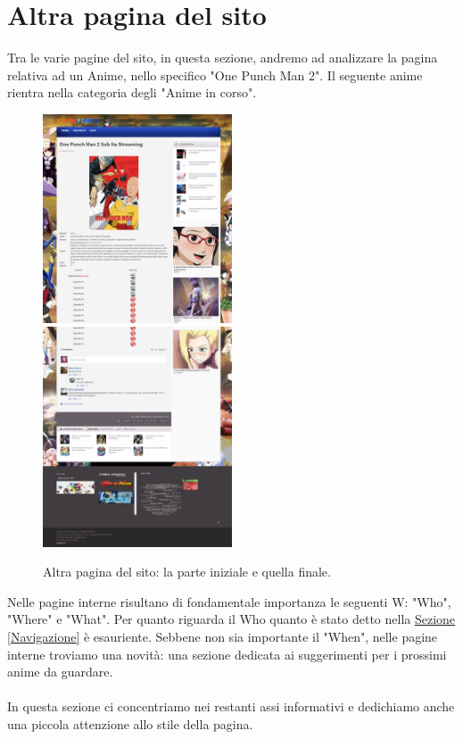 \section{Altra pagina del sito}
Tra le varie pagine del sito, in questa sezione, andremo ad analizzare la pagina relativa ad un Anime, nello specifico "One Punch Man 2". Il seguente anime rientra nella categoria degli "Anime in corso".

\begin{figure}[H]
	\includegraphics[width=0.5\textwidth]{img/Pag2_01.png}
	\includegraphics[width=0.5\textwidth]{img/Pag2_02.png}
	\caption{Altra pagina del sito: la parte iniziale e quella finale.} 
	\label{img7} 
\end{figure}

Nelle pagine interne risultano di fondamentale importanza le seguenti W: "Who", "Where" e "What". Per quanto riguarda il Who quanto è stato detto nella \hyperref[Navigazione]{Sezione \ref{Navigazione}} è esauriente. Sebbene non sia importante il "When", nelle pagine interne troviamo una novità: una sezione dedicata ai suggerimenti per i prossimi anime da guardare.\\ \\
In questa sezione ci concentriamo nei restanti assi informativi e dedichiamo anche una piccola attenzione allo stile della pagina.

